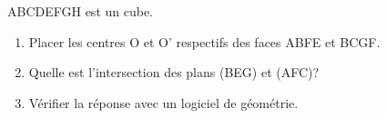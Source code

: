 
ABCDEFGH est un cube.
\begin{enumerate}
\item Placer les centres O et O' respectifs des faces ABFE et BCGF. 
\item  Quelle est l'intersection des plans (BEG) et (AFC)?  
\item  Vérifier la réponse avec un logiciel de géométrie.
\end{enumerate}
